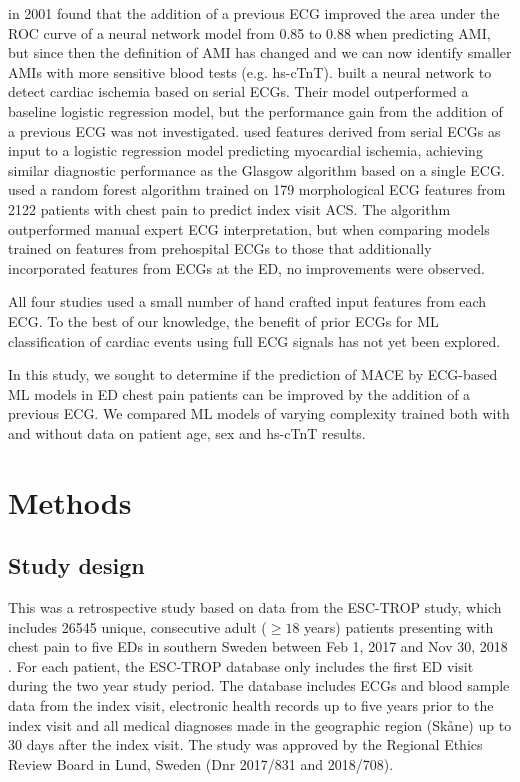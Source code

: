 \documentclass[preprint]{elsarticle}
\begin{document}
\citet{ohlsson2001} in 2001 found that the addition of a previous ECG improved the area under the ROC curve of a neural network model from 0.85 to 0.88 when predicting AMI, but since then the definition of AMI has changed and we can now identify smaller AMIs with more sensitive blood tests (e.g. hs-cTnT). \citet{sbrollini2019} built a neural network to detect cardiac ischemia based on serial ECGs. Their model outperformed a baseline logistic regression model, but the performance gain from the addition of a previous ECG was not investigated. \citet{terhaar2019} used features derived from serial ECGs as input to a logistic regression model predicting myocardial ischemia, achieving similar diagnostic performance as the Glasgow algorithm based on a single ECG. \citet{bouzid2023} used a random forest algorithm trained on 179 morphological ECG features from 2122 patients with chest pain to predict index visit ACS. The algorithm outperformed manual expert ECG interpretation, but when comparing models trained on features from prehospital ECGs to those that additionally incorporated features from ECGs at the ED, no improvements were observed. 

All four studies used a small number of hand crafted input features from each ECG. To the best of our knowledge, the benefit of prior ECGs for ML classification of cardiac events using full ECG signals has not yet been explored.

In this study, we sought to determine if the prediction of MACE by ECG-based ML models in ED chest pain patients can be improved by the addition of a previous ECG. We compared ML models of varying complexity trained both with and without data on patient age, sex and hs-cTnT results.

\section{Methods}
\subsection{Study design}
This was a retrospective study based on data from the ESC-TROP study, which includes 26545 unique, consecutive adult ($\geq 18$ years) patients presenting with chest pain to five EDs in southern Sweden between Feb 1, 2017 and Nov 30, 2018 \citep{mokhtari2020}. For each patient, the ESC-TROP database only includes the first ED visit during the two year study period. The database includes ECGs and blood sample data from the index visit, electronic health records up to five years prior to the index visit and all medical diagnoses made in the geographic region (Sk\aa{}ne) up to 30 days after the index visit. The study was approved by the Regional Ethics Review Board in Lund, Sweden (Dnr 2017/831 and 2018/708). 
\end{document}
